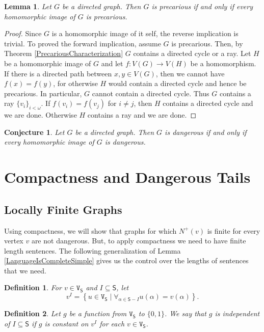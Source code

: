 \documentclass[12pt]{article}
\newtheorem{lem}[thm]{Lemma}
\newtheorem{conj}[thm]{Conjecture}
\newtheorem{defn}{Definition}
\theoremstyle{remark}
\def\S{\textsf{S}}
\def\V{\texttt{V}}
\begin{document}
\begin{lem}
Let $G$ be a directed graph.  Then $G$ is precarious if and only if every homomorphic image of $G$ is precarious.
\end{lem}
\begin{proof}
Since $G$ is a homomorphic image of it self, the reverse implication is trivial.  To proved the forward implication, assume $G$ is precarious.  Then, by Theorem \ref{PrecariousCharacterization} $G$ contains a directed cycle or a ray.  Let $H$ be a homomorphic image of $G$ and let $f:V(G) \rightarrow V(H)$ be a homomorphism.  If there is a directed path between $x,y \in V(G)$, then we cannot have $f(x) = f(y)$, for otherwise $H$ would contain a directed cycle and hence be precarious.  In particular, $G$ cannot contain a directed cycle.  Thus $G$ contains a ray $\{v_i\}_{i < \omega}$.  If $f(v_i) = f(v_j)$ for $i \neq j$, then $H$ contains a directed cycle and we are done.  Otherwise $H$ contains a ray and we are done.
\end{proof}

\begin{conj}
Let $G$ be a directed graph.  Then $G$ is dangerous if and only if every homomorphic image of $G$ is dangerous.
\end{conj}

\section{Compactness and Dangerous Tails}
\label{sec6}

\subsection{Locally Finite Graphs}
Using compactness, we will show that graphs for which $N^+(v)$ is finite for every vertex $v$ are not dangerous. But, to apply compactness we need to have finite length sentences. The following generalization of Lemma \ref{LanguageIsCompleteSimple} gives us the control over the lengths of sentences that we need.

\begin{defn}
For $v \in \V_\S$ and $I \subseteq \S$, let
\[v^I = \left\{u \in  \V_\S \mid \forall_{\alpha \in \S - I} u(\alpha) = v(\alpha)\right\}.\]
\end{defn}

\begin{defn}
Let $g$ be a function from $\V_\S$ to $\{0, 1\}$.  We say that $g$ is \emph{independent of} $I \subseteq \S$ if $g$ is constant on $v^I$ for each $v \in \V_\S$.
\end{defn}
\end{document}
